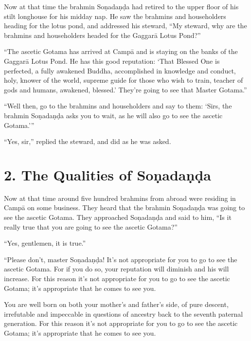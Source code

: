 \documentclass[12pt,openany]{book}%
\begin{document}
Now at that time the brahmin \textsanskrit{Soṇadaṇḍa} had retired to the upper floor of his stilt longhouse for his midday nap. He saw the brahmins and householders heading for the lotus pond, and addressed his steward, “My steward, why are the brahmins and householders headed for the \textsanskrit{Gaggarā} Lotus Pond?” 

“The ascetic Gotama has arrived at \textsanskrit{Campā} and is staying on the banks of the \textsanskrit{Gaggarā} Lotus Pond. He has this good reputation: ‘That Blessed One is perfected, a fully awakened Buddha, accomplished in knowledge and conduct, holy, knower of the world, supreme guide for those who wish to train, teacher of gods and humans, awakened, blessed.’ They’re going to see that Master Gotama.” 

“Well then, go to the brahmins and householders and say to them: ‘Sirs, the brahmin \textsanskrit{Soṇadaṇḍa} asks you to wait, as he will also go to see the ascetic Gotama.’” 

“Yes, sir,” replied the steward, and did as he was asked. 

\section*{2. The Qualities of \textsanskrit{Soṇadaṇḍa} }

Now at that time around five hundred brahmins from abroad were residing in \textsanskrit{Campā} on some business. They heard that the brahmin \textsanskrit{Soṇadaṇḍa} was going to see the ascetic Gotama. They approached \textsanskrit{Soṇadaṇḍa} and said to him, “Is it really true that you are going to see the ascetic Gotama?” 

“Yes, gentlemen, it is true.” 

“Please don’t, master \textsanskrit{Soṇadaṇḍa}! It’s not appropriate for you to go to see the ascetic Gotama. For if you do so, your reputation will diminish and his will increase. For this reason it’s not appropriate for you to go to see the ascetic Gotama; it’s appropriate that he comes to see you. 

You are well born on both your mother’s and father’s side, of pure descent, irrefutable and impeccable in questions of ancestry back to the seventh paternal generation. For this reason it’s not appropriate for you to go to see the ascetic Gotama; it’s appropriate that he comes to see you. 
\end{document}
